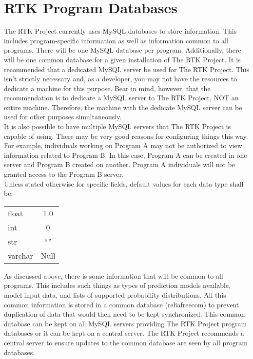 \documentclass[11pt, 12pt, twoside, onecolumn]{article}
\begin{document}
\section{\bf \Large RTK Program Databases}

\noindent The RTK Project currently uses MySQL databases to store information.  This includes program-specific information as well as information common to all programs.  There will be one MySQL database per program.  Additionally, there will be one common database for a given installation of The RTK Project.  It is recommended that a dedicated MySQL server be used for The RTK Project.  This isn't strictly necessary and, as a developer, you may not have the resources to dedicate a machine for this purpose.  Bear in mind, however, that the recommendation is to dedicate a MySQL server to The RTK Project, NOT an entire machine.  Therefore, the machine with the dedicate MySQL server can be used for other purposes simultaneously. \\

\noindent It is also possible to have multiple MySQL servers that The RTK Project is capable of using.  There may be very good reasons for configuring things this way.  For example, individuals working on Program A may not be authorized to view information related to Program B.  In this case, Program A can be created in one server and Program B created on another.  Program A individuals will not be granted access to the Program B server. \\

\noindent Unless stated otherwise for specific fields, default values for each data type shall be:

\bigskip
\begin{tabular}{l c}
float & 1.0 \\
int & 0 \\
str & ``'' \\
varchar & Null \\
\end{tabular}
\bigskip

\noindent As discussed above, there is some information that will be common to all programs.  This includes such things as types of prediction models available, model input data, and lists of supported probability distributions.  All this common information is stored in a common database (reliafreecom) to prevent duplication of data that would then need to be kept synchronized.  This common database can be kept on all MySQL servers providing The RTK Project program databases or it can be kept on a central server.  The RTK Project recommends a central server to ensure updates to the common database are seen by all program databases. \\
\end{document}

